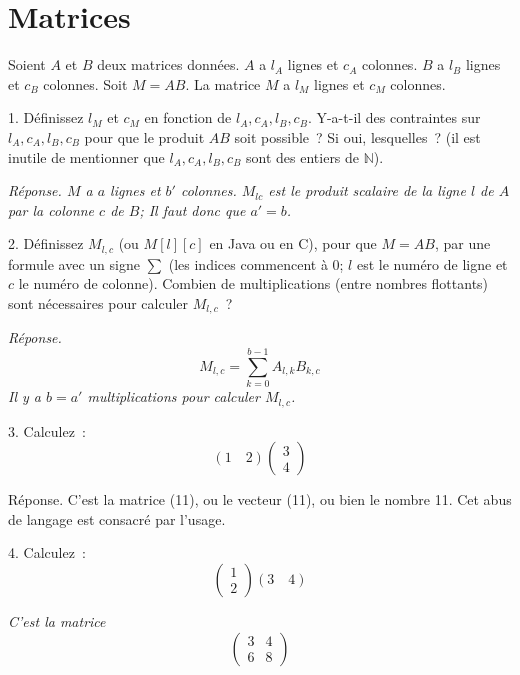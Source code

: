 \documentclass[11pt]{article}
\def\N{\mathbb N}
\begin{document}
{
\section{Matrices}
Soient $A$ et $B$ deux matrices données. $A$ a $l_A$ lignes et $c_A$ colonnes.
$B$ a $l_B$ lignes et $c_B$ colonnes. Soit $M= A B$. La matrice $M$ a $l_M$ lignes et $c_M$ colonnes. 

1. Définissez $l_M$ et $c_M$ en fonction de $l_A, c_A, l_B, c_B$. Y-a-t-il des
contraintes  sur $l_A, c_A, l_B, c_B$
pour que le produit $AB$ soit possible~? Si oui, lesquelles~? (il est inutile de mentionner que  $l_A, c_A, l_B, c_B$ sont des entiers de $\N$).  

\ifcorrige

\medskip
{\it 
Réponse. $M$ a $a$ lignes et $b'$ colonnes. $M_{lc}$ est le produit scalaire
de la ligne $l$ de $A$ par la colonne $c$ de $B$; Il faut donc que $a'=b$. 
}
\medskip


\else
\fi

2. Définissez $M_{l,c}$ (ou $M[l][c]$ en Java ou en C), pour que $M=AB$,
par une formule avec un signe $\sum$ (les indices commencent à 0; $l$ est le numéro de ligne et $c$ le numéro de colonne).
Combien de multiplications (entre nombres flottants) sont nécessaires pour calculer  $M_{l,c}$~?

\ifcorrige

\medskip
{\it 
Réponse. $$M_{l,c}= \sum_{k=0}^{b-1} A_{l,k} B_{k,c} $$
Il y a $b=a'$ multiplications pour calculer $M_{l,c}$.
}
\medskip


\else
\fi


{
3.  Calculez~:
$$\left( 1 \quad 2\right) \left(\begin{array}{c} 3\\
4
\end{array}\right) $$


{
\ifcorrige

\medskip
{\it

Réponse. C'est la matrice (11), ou le vecteur (11), ou bien le nombre 11. Cet abus de langage est consacré par l'usage. 
}
\medskip

\else
\fi
}

4. Calculez~:
$$\left(\begin{array}{c} 1 \\
2
\end{array}\right) \left( 3\quad 4\right) $$

\ifcorrige

\medskip

{\it C'est la matrice $$\left(\begin{array}{cc} 3 & 4 \\
6 & 8 \end{array}\right)$$
}
\medskip


\else
\fi
}
\bigskip
}
\end{document}
